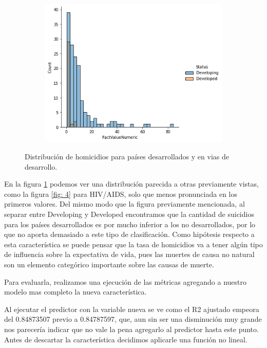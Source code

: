 \begin{figure}[H]
              \centering
              \begin{subfigure}{0.5\linewidth}
                \centering
                \includegraphics[width=\textwidth]{img/dist_homicides.png}
              \end{subfigure}
               \caption{Distribución de homicidios para países desarrollados y en vias de desarrollo.}
               \label{fig:dist_homicides}
        \end{figure}

En la figura \ref{fig:dist_homicides} podemos ver una distribución parecida a otras previamente vistas, como la figura \ref{fig: 4} para HIV/AIDS, solo que menos pronunciada en los primeros valores. Del mismo modo que la figura previamente mencionada, al separar entre Developing y Developed encontramos que la cantidad de suicidios para los países desarrollados es por mucho inferior a los no desarrollados, por lo que no aporta demasiado a este tipo de clasificación.
Como hipótesis respecto a esta característica se puede pensar que la tasa de homicidios va a tener algún tipo de influencia sobre la expectativa de vida, pues las muertes de causa no natural son un elemento categórico importante sobre las causas de muerte.

Para evaluarla, realizamos una ejecución de las métricas agregando a nuestro modelo mas completo la nueva característica.

Al ejecutar el predictor con la variable nueva se ve como el R2 ajustado empeora del 0.84873507 previo a 0.84787597, que, aun sin ser una disminución muy grande nos parecería indicar que no vale la pena agregarlo al predictor hasta este punto. Antes de descartar la característica decidimos aplicarle una función no lineal.

